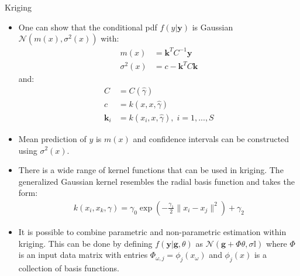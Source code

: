 \documentclass[9pt]{beamer}
\begin{document}
\begin{frame}{Kriging}

\begin{itemize}
 
\item One can show that the conditional pdf $f(y|\mathbf{y})$ is Gaussian $\mathcal{N}(m(x),\sigma^2(x))$ with:
\begin{align*}
m(x)&=\mathbf{k}^TC^{-1}\mathbf{y}\\
\sigma^2(x)&=c-\mathbf{k}^TC\mathbf{k}
\end{align*}
and:
\begin{align*}
C&=C(\hat{\gamma})\\
c&=k(x,x,\hat{\gamma})\\
\mathbf{k}_i&=k(x_i,x,\hat{\gamma}),\; i=1,...,S
\end{align*}
\item Mean prediction of $y$ is $m(x)$ and confidence intervals can be constructed using $\sigma^2(x)$.
\item There is a wide range of kernel functions that can be used in kriging. The generalized Gaussian kernel resembles the radial basis function and takes the form:
\begin{align*}
k(x_i,x_k,\gamma)=\gamma_0\exp\left(-\frac{\gamma_1}{2}\|x_i-x_j\|^2\right)+\gamma_2
\end{align*}
\item It is possible to combine parametric and non-parametric estimation within kriging. This can be done by defining $f(\mathbf{y}|\mathbf{g},\theta)$ as $\mathcal{N}(\mathbf{g}+\Phi\theta,\sigma \mathbb{I})$ where $\Phi$ is an input data matrix with entries $\Phi_{\omega,j}=\phi_j(x_\omega)$ and $\phi_j(x)$ is a collection of basis functions. 


\end{itemize}


\end{frame}
\end{document}
